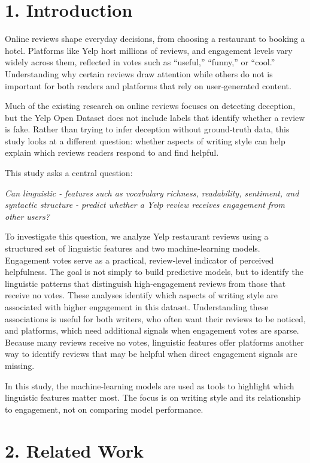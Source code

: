 \documentclass[
]{article}
\begin{document}
\hypertarget{introduction}{%
\section{1. Introduction}\label{introduction}}

Online reviews shape everyday decisions, from choosing a restaurant to
booking a hotel. Platforms like Yelp host millions of reviews, and
engagement levels vary widely across them, reflected in votes such as
``useful,'' ``funny,'' or ``cool.'' Understanding why certain reviews
draw attention while others do not is important for both readers and
platforms that rely on user‑generated content.

Much of the existing research on online reviews focuses on detecting
deception, but the Yelp Open Dataset does not include labels that
identify whether a review is fake. Rather than trying to infer deception
without ground‑truth data, this study looks at a different question:
whether aspects of writing style can help explain which reviews readers
respond to and find helpful.

This study asks a central question:

\emph{Can linguistic - features such as vocabulary richness,
readability, sentiment, and syntactic structure - predict whether a Yelp
review receives engagement from other users?}

To investigate this question, we analyze Yelp restaurant reviews using a
structured set of linguistic features and two machine‑learning models.
Engagement votes serve as a practical, review‑level indicator of
perceived helpfulness. The goal is not simply to build predictive
models, but to identify the linguistic patterns that distinguish
high‑engagement reviews from those that receive no votes. These analyses
identify which aspects of writing style are associated with higher
engagement in this dataset. Understanding these associations is useful
for both writers, who often want their reviews to be noticed, and
platforms, which need additional signals when engagement votes are
sparse. Because many reviews receive no votes, linguistic features offer
platforms another way to identify reviews that may be helpful when
direct engagement signals are missing.

In this study, the machine‑learning models are used as tools to
highlight which linguistic features matter most. The focus is on writing
style and its relationship to engagement, not on comparing model
performance.

\hypertarget{related-work}{%
\section{2. Related Work}\label{related-work}}
\end{document}

